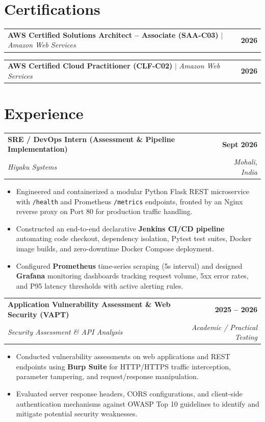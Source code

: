 \documentclass[letterpaper,9.8pt]{article}
\makeatletter
\newcommand{\resumeItemListStart}{\begin{itemize}[leftmargin=0.18in, labelsep=0.06in, itemsep=0.8pt, topsep=0.5pt, parsep=0pt, partopsep=0pt]}
\newcommand{\resumeItemListEnd}{\end{itemize}\vspace{2pt}}
\newcommand{\resumeExpHeader}[4]{
  \vspace{1pt}
  \begin{tabular*}{1.0\textwidth}[t]{l@{\extracolsep{\fill}}r}
    \textbf{#1} & \textbf{\small #2} \\
    \textit{\small #3} & \textit{\small #4} \\
  \end{tabular*}\vspace{-3.5pt}
}
\newcommand{\resumeCertHeader}[3]{
  \vspace{0.5pt}
  \begin{tabular*}{1.0\textwidth}[t]{l@{\extracolsep{\fill}}r}
    \textbf{#1} $\vert$ \textit{\small #2} & \textbf{\small #3} \\
  \end{tabular*}\vspace{-3.5pt}
}
\makeatother
\begin{document}
\section{Certifications}
\resumeCertHeader{AWS Certified Solutions Architect -- Associate (SAA-C03)}{Amazon Web Services}{2026}
\resumeCertHeader{AWS Certified Cloud Practitioner (CLF-C02)}{Amazon Web Services}{2026}
\vspace{2pt}

\section{Experience}
\resumeExpHeader{SRE / DevOps Intern (Assessment \& Pipeline Implementation)}{Sept 2026}{Hiyaku Systems}{Mohali, India}
\resumeItemListStart
  \item \small{Engineered and containerized a modular Python Flask REST microservice with \texttt{/health} and Prometheus \texttt{/metrics} endpoints, fronted by an Nginx reverse proxy on Port 80 for production traffic handling.}
  \item \small{Constructed an end-to-end declarative \textbf{Jenkins CI/CD pipeline} automating code checkout, dependency isolation, Pytest test suites, Docker image builds, and zero-downtime Docker Compose deployment.}
  \item \small{Configured \textbf{Prometheus} time-series scraping (5s interval) and designed \textbf{Grafana} monitoring dashboards tracking request volume, 5xx error rates, and P95 latency thresholds with active alerting rules.}
\resumeItemListEnd

\resumeExpHeader{Application Vulnerability Assessment \& Web Security (VAPT)}{2025 -- 2026}{Security Assessment \& API Analysis}{Academic / Practical Testing}
\resumeItemListStart
  \item \small{Conducted vulnerability assessments on web applications and REST endpoints using \textbf{Burp Suite} for HTTP/HTTPS traffic interception, parameter tampering, and request/response manipulation.}
  \item \small{Evaluated server response headers, CORS configurations, and client-side authentication mechanisms against OWASP Top 10 guidelines to identify and mitigate potential security weaknesses.}
\resumeItemListEnd

\end{document}
